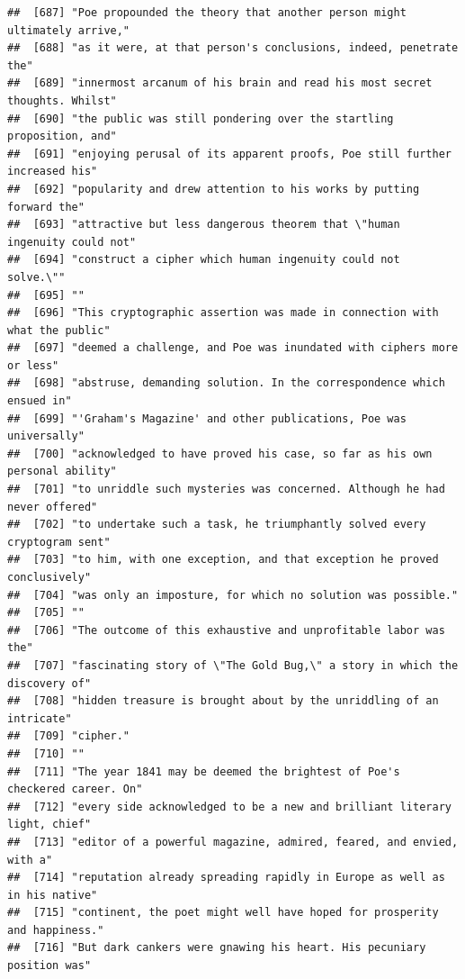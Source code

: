 \documentclass{article}\usepackage[]{graphicx}\usepackage[]{color}
\makeatletter
\newenvironment{kframe}{%
 \def\at@end@of@kframe{}%
 \ifinner\ifhmode%
  \def\at@end@of@kframe{\end{minipage}}%
  \begin{minipage}{\columnwidth}%
 \fi\fi%
 \def\FrameCommand##1{\hskip\@totalleftmargin \hskip-\fboxsep
 \colorbox{shadecolor}{##1}\hskip-\fboxsep
     \hskip-\linewidth \hskip-\@totalleftmargin \hskip\columnwidth}%
 \MakeFramed {\advance\hsize-\width
   \@totalleftmargin\z@ \linewidth\hsize
   \@setminipage}}%
 {\par\unskip\endMakeFramed%
 \at@end@of@kframe}
\newenvironment{knitrout}{}{} %
\makeatother
\begin{document}
\begin{knitrout}
\begin{kframe}
\begin{verbatim}
##  [687] "Poe propounded the theory that another person might ultimately arrive,"      
##  [688] "as it were, at that person's conclusions, indeed, penetrate the"             
##  [689] "innermost arcanum of his brain and read his most secret thoughts. Whilst"    
##  [690] "the public was still pondering over the startling proposition, and"          
##  [691] "enjoying perusal of its apparent proofs, Poe still further increased his"    
##  [692] "popularity and drew attention to his works by putting forward the"           
##  [693] "attractive but less dangerous theorem that \"human ingenuity could not"      
##  [694] "construct a cipher which human ingenuity could not solve.\""                 
##  [695] ""                                                                            
##  [696] "This cryptographic assertion was made in connection with what the public"    
##  [697] "deemed a challenge, and Poe was inundated with ciphers more or less"         
##  [698] "abstruse, demanding solution. In the correspondence which ensued in"         
##  [699] "'Graham's Magazine' and other publications, Poe was universally"             
##  [700] "acknowledged to have proved his case, so far as his own personal ability"    
##  [701] "to unriddle such mysteries was concerned. Although he had never offered"     
##  [702] "to undertake such a task, he triumphantly solved every cryptogram sent"      
##  [703] "to him, with one exception, and that exception he proved conclusively"       
##  [704] "was only an imposture, for which no solution was possible."                  
##  [705] ""                                                                            
##  [706] "The outcome of this exhaustive and unprofitable labor was the"               
##  [707] "fascinating story of \"The Gold Bug,\" a story in which the discovery of"    
##  [708] "hidden treasure is brought about by the unriddling of an intricate"          
##  [709] "cipher."                                                                     
##  [710] ""                                                                            
##  [711] "The year 1841 may be deemed the brightest of Poe's checkered career. On"     
##  [712] "every side acknowledged to be a new and brilliant literary light, chief"     
##  [713] "editor of a powerful magazine, admired, feared, and envied, with a"          
##  [714] "reputation already spreading rapidly in Europe as well as in his native"     
##  [715] "continent, the poet might well have hoped for prosperity and happiness."     
##  [716] "But dark cankers were gnawing his heart. His pecuniary position was"         

\end{verbatim}
\end{kframe}
\end{knitrout}
\end{document}

